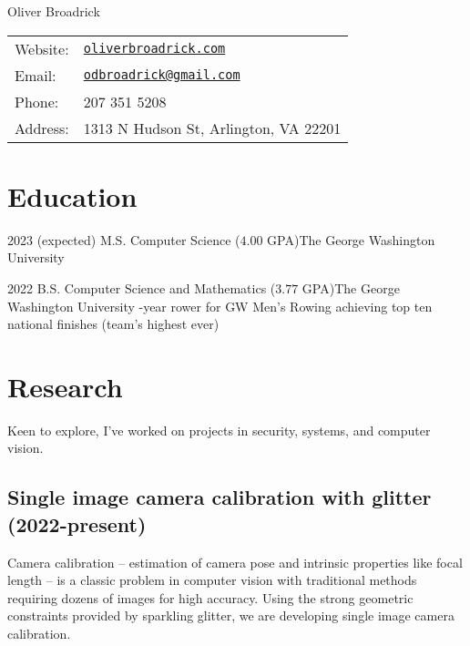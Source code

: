 \documentclass[letterpaper]{article}
\def\name{Oliver Broadrick}
\renewenvironment{itemize}{
  \begin{list}{}{
    \setlength{\leftmargin}{1.5em}
  }
}{
  \end{list}
}
\begin{document}
{\huge \name}

\vspace{0.25in}

\begin{minipage}{0.45\linewidth}
  \begin{tabular}{ll}
    Website: & \href{https://oliverbroadrick.com/}{\tt oliverbroadrick.com} \\
    Email: & \href{mailto:odbroadrick@gmail.com}{\tt odbroadrick@gmail.com} \\
    Phone: & 207 351 5208 \\
    Address: & 1313 N Hudson St, Arlington, VA 22201
  \end{tabular}
\end{minipage}


\section*{Education}

\begin{itemize}

\item 2023 (expected) M.S. Computer Science ($4.00$ GPA)\hfill The George Washington University
\item 2022 B.S. Computer Science and Mathematics ($3.77$ GPA)\hfill The George Washington University
    -year rower for GW Men's Rowing achieving top ten national finishes (team's highest ever)

\end{itemize}

\section*{Research}

Keen to explore, I've worked on projects in security, systems, and computer vision. 

\subsection*{Single image camera calibration with glitter (2022-present)}
Camera calibration -- estimation of camera pose and intrinsic properties like focal length -- is a classic problem in computer vision with traditional methods requiring dozens of images for high accuracy. Using the strong geometric constraints provided by sparkling glitter, we are developing single image camera calibration.
\end{document}
